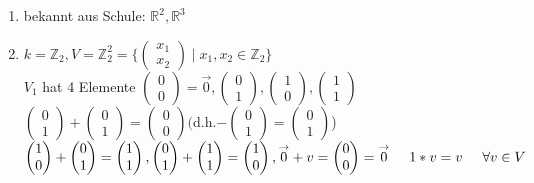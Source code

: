 \documentclass[a4paper,11pt]{article}
\begin{document}
\begin{enumerate}[label=\alph*)]
\vspace{-5mm}
\item bekannt aus Schule: $\mathbb{R}^2, \mathbb{R}^3$
\item $k=\mathbb{Z}_2, V=\mathbb{Z}^2_2=\{\begin{pmatrix}x_1\\x_2\end{pmatrix}\mid x_1,x_2\in\mathbb{Z}_2\}$ \\
$V_1$ hat 4 Elemente $\begin{pmatrix}0\\0\end{pmatrix}=\overset{\rightarrow}{0}, \begin{pmatrix}0\\1\end{pmatrix},\begin{pmatrix}1\\0\end{pmatrix},\begin{pmatrix}1\\1\end{pmatrix}$ \\
$\begin{pmatrix}0\\1\end{pmatrix}+\begin{pmatrix}0\\1\end{pmatrix}=\begin{pmatrix}0\\0\end{pmatrix} ($d.h.$-\begin{pmatrix}0\\1\end{pmatrix}=\begin{pmatrix}0\\1\end{pmatrix}$) \\
$\begin{pmatrix}1\\0\end{pmatrix}+\begin{pmatrix}0\\1\end{pmatrix}=\begin{pmatrix}1\\1\end{pmatrix}, \begin{pmatrix}0\\1\end{pmatrix}+\begin{pmatrix}1\\1\end{pmatrix}=\begin{pmatrix}1\\0\end{pmatrix}, \overset{\rightarrow}{0}+v=\begin{pmatrix}0\\0\end{pmatrix}=\overset{\rightarrow}{0}\hspace{5mm}1*v=v\hspace{5mm}\forall v\in V$

\end{enumerate}
\end{document}
